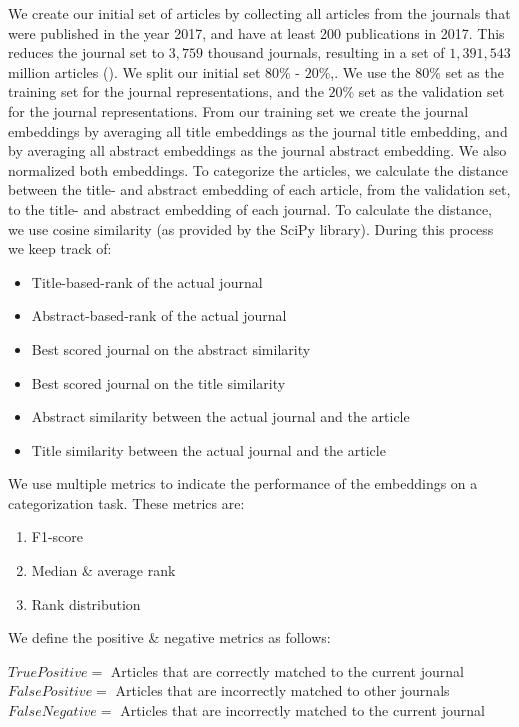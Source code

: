 \documentclass[../../Thesis.tex]{subfiles}
\begin{document}
We create our initial set of articles by collecting all articles from the journals that were published in the year 2017, and have at least 200 publications in 2017. This reduces the journal set to $3,759$ thousand journals, resulting in a set of $1,391,543$ million articles ().
We split our initial set  $80\%$ - $20\%$,. We use the $80\%$ set as the training set for the journal representations, and the $20\%$ set as the validation set for the journal representations.
From our training set we create the journal embeddings by averaging all title embeddings as the journal title embedding, and by averaging all abstract embeddings as the journal abstract embedding. We also normalized both embeddings. 
To categorize the articles, we calculate the distance between the title- and abstract embedding of each article, from the validation set, to the title- and abstract embedding of each journal. To calculate the distance, we use cosine similarity (as provided by the SciPy library\cite{SciPy}). During this process we keep track of:
\begin{itemize}
\item{Title-based-rank of the actual journal}
\item{Abstract-based-rank of the actual journal}
\item{Best scored journal on the abstract similarity}
\item{Best scored journal on the title similarity}
\item{Abstract similarity between the actual journal and the article}
\item{Title similarity between the actual journal and the article}
\end{itemize}
We use multiple metrics to indicate the performance of the embeddings on a categorization task. These metrics are:
\begin{enumerate}
\item{F1-score}
\item{Median \& average rank}
\item{Rank distribution}
\end{enumerate}
We define the positive \& negative metrics as follows:\\
\begin{jumpin}
$True Positive = $ Articles that are correctly matched to the current journal\\
$False Positive = $ Articles that are incorrectly matched to other journals\\
$False Negative = $ Articles that are incorrectly matched to the current journal\\
\end{jumpin}
\end{document}
